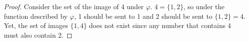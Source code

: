\documentclass{article}
\begin{document}
\begin{enumerate}
\begin{proof}
      Consider the set of the image of 4 under $\varphi$. $4=\{1,2\}$, so
      under the function described by $\varphi$, 1 should be sent to 1 and
      2 should be sent to $\{1,2\}=4$. Yet, the set of images $\{1,4\}$
      does not exist since any number that contains 4 must also contain 2.
    \end{proof}
\end{enumerate}
\end{document}
